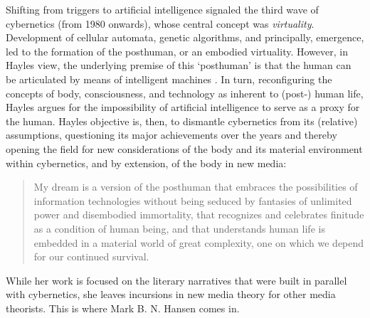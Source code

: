 Shifting from triggers to artificial intelligence signaled the third wave of cybernetics (from 1980 onwards), whose central concept was \textit{virtuality}. Development of cellular automata, genetic algorithms, and principally, emergence, led to the formation of the posthuman, or an embodied virtuality. However, in Hayles view, the underlying premise of this `posthuman' is that the human can be articulated by means of intelligent machines \parencite[17-8]{Hay99:How}. In turn, reconfiguring the concepts of body, consciousness, and technology as inherent to (post-) human life, Hayles argues for the impossibility of artificial intelligence to serve as a proxy for the human. Hayles objective is, then, to dismantle cybernetics from its (relative) assumptions, questioning its major achievements over the years and thereby opening the field for new considerations of the body and its material environment within cybernetics, and by extension, of the body in new media:

\begin{quote}
	My dream is a version of the posthuman that embraces the possibilities of information technologies without being seduced by fantasies of unlimited power and disembodied immortality, that recognizes and celebrates finitude as a condition of human being, and that understands human life is embedded in a material world of great complexity, one on which we depend for our continued survival. \parencite[5]{Hay99:How}
\end{quote}

While her work is focused on the literary narratives that were built in parallel with cybernetics, she leaves incursions in new media theory for other media theorists. This is where Mark B. N. Hansen comes in.
